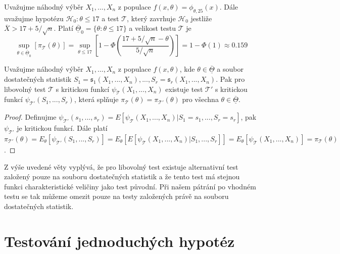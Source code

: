 \begin{example}
Uvažujme náhodný výběr $X_1, ..., X_n$ z populace $f(x, \theta) = \phi_{\theta, 25}(x)$. Dále uvažujme hypotézu $\mathscr{H}_0: \theta \le 17$ a test $\mathscr{T}$, který zavrhuje $\mathscr{H}_0$ jestliže $\overline{X} > 17 + 5 / \sqrt{n}$. Platí $\overline{\underline{\Theta}}_0 = \{\theta: \theta \le 17\}$ a velikost testu $\mathscr{T}$ je
\begin{equation*}
\sup_{\theta \in \overline{\underline{\Theta}}_0}[\pi_{\mathscr{T}}(\theta)] = \sup_{\theta \le 17}\left[1 - \Phi\left(\frac{17 + 5 / \sqrt{n} - \theta}{5 / \sqrt{n}}\right)\right] = 1 - \Phi(1) \approx 0.159
\end{equation*}
\end{example}

\begin{theorem}
Uvažujme náhodný výběr $X_1, ..., X_n$ z populace $f(x, \theta)$, kde $\theta \in \overline{\underline{\Theta}}$ a soubor dostatečných statistik $S_1 = \mathfrak{s}_1(X_1, ..., X_n), ..., S_r = \mathfrak{s}_r(X_1, ..., X_n)$. Pak pro libovolný test $\mathscr{T}$ s kritickou funkcí $\psi_{\mathscr{T}}(X_1, ..., X_n)$ existuje test $\mathscr{T}'$ s kritickou funkcí $\psi_{\mathscr{T}'}(S_1, ..., S_r)$, která splňuje $\pi_{\mathscr{T}}(\theta) = \pi_{\mathscr{T}'}(\theta)$ pro všechna $\theta \in \overline{\underline{\Theta}}$.
\end{theorem}

\begin{proof}
Definujme $\psi_{\mathscr{T}'}(s_1, ..., s_r) = E[\psi_{\mathscr{T}}(X_1, ..., X_n)|S_1 = s_1, ..., S_r = s_r]$, pak $\psi_{\mathscr{T}'}$ je kritickou funkcí. Dále platí $\pi_{\mathscr{T}'}(\theta) = E_{\theta}[\psi_{\mathscr{T}'}(S_1, ..., S_r)] = E_{\theta}[E[\psi_{\mathscr{T}}(X_1, ..., X_n)|S_1, ..., S_r]] = E_{\theta}[\psi_{\mathscr{T}}(X_1, ..., X_n)] = \pi_{\mathscr{T}}(\theta)$.
\end{proof}

Z výše uvedené věty vyplývá, že pro libovolný test existuje alternativní test založený pouze na souboru dostatečných statistik a že tento test má stejnou funkci charakteristické veličiny jako test původní. Při našem pátrání po vhodném testu se tak můžeme omezit pouze na testy založených právě na souboru dostatečných statistik.

\section{Testování jednoduchých hypotéz}

